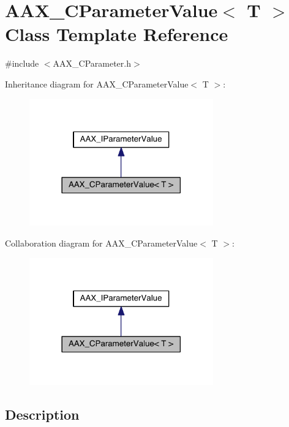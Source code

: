 \hypertarget{a00035}{}\section{A\+A\+X\+\_\+\+C\+Parameter\+Value$<$ T $>$ Class Template Reference}
\label{a00035}


{\ttfamily \#include $<$A\+A\+X\+\_\+\+C\+Parameter.\+h$>$}



Inheritance diagram for A\+A\+X\+\_\+\+C\+Parameter\+Value$<$ T $>$\+:
\nopagebreak
\begin{figure}[H]
\begin{center}
\leavevmode
\includegraphics[width=225pt]{a00452}
\end{center}
\end{figure}


Collaboration diagram for A\+A\+X\+\_\+\+C\+Parameter\+Value$<$ T $>$\+:
\nopagebreak
\begin{figure}[H]
\begin{center}
\leavevmode
\includegraphics[width=225pt]{a00453}
\end{center}
\end{figure}


\subsection{Description}
